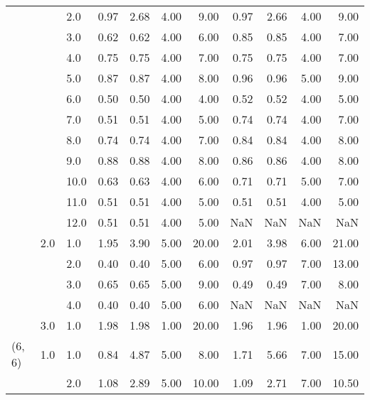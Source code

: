 \begin{tabular}{lllrrrrrrrr}
       &     & 2.0  &       0.97 &      2.68 & 4.00 &   9.00 &       0.97 &      2.66 & 4.00 &   9.00 \\
       &     & 3.0  &       0.62 &      0.62 & 4.00 &   6.00 &       0.85 &      0.85 & 4.00 &   7.00 \\
       &     & 4.0  &       0.75 &      0.75 & 4.00 &   7.00 &       0.75 &      0.75 & 4.00 &   7.00 \\
       &     & 5.0  &       0.87 &      0.87 & 4.00 &   8.00 &       0.96 &      0.96 & 5.00 &   9.00 \\
       &     & 6.0  &       0.50 &      0.50 & 4.00 &   4.00 &       0.52 &      0.52 & 4.00 &   5.00 \\
       &     & 7.0  &       0.51 &      0.51 & 4.00 &   5.00 &       0.74 &      0.74 & 4.00 &   7.00 \\
       &     & 8.0  &       0.74 &      0.74 & 4.00 &   7.00 &       0.84 &      0.84 & 4.00 &   8.00 \\
       &     & 9.0  &       0.88 &      0.88 & 4.00 &   8.00 &       0.86 &      0.86 & 4.00 &   8.00 \\
       &     & 10.0 &       0.63 &      0.63 & 4.00 &   6.00 &       0.71 &      0.71 & 5.00 &   7.00 \\
       &     & 11.0 &       0.51 &      0.51 & 4.00 &   5.00 &       0.51 &      0.51 & 4.00 &   5.00 \\
       &     & 12.0 &       0.51 &      0.51 & 4.00 &   5.00 &        NaN &       NaN &  NaN &    NaN \\
       & 2.0 & 1.0  &       1.95 &      3.90 & 5.00 &  20.00 &       2.01 &      3.98 & 6.00 &  21.00 \\
       &     & 2.0  &       0.40 &      0.40 & 5.00 &   6.00 &       0.97 &      0.97 & 7.00 &  13.00 \\
       &     & 3.0  &       0.65 &      0.65 & 5.00 &   9.00 &       0.49 &      0.49 & 7.00 &   8.00 \\
       &     & 4.0  &       0.40 &      0.40 & 5.00 &   6.00 &        NaN &       NaN &  NaN &    NaN \\
       & 3.0 & 1.0  &       1.98 &      1.98 & 1.00 &  20.00 &       1.96 &      1.96 & 1.00 &  20.00 \\
(6, 6) & 1.0 & 1.0  &       0.84 &      4.87 & 5.00 &   8.00 &       1.71 &      5.66 & 7.00 &  15.00 \\
       &     & 2.0  &       1.08 &      2.89 & 5.00 &  10.00 &       1.09 &      2.71 & 7.00 &  10.50 \\

\end{tabular}
